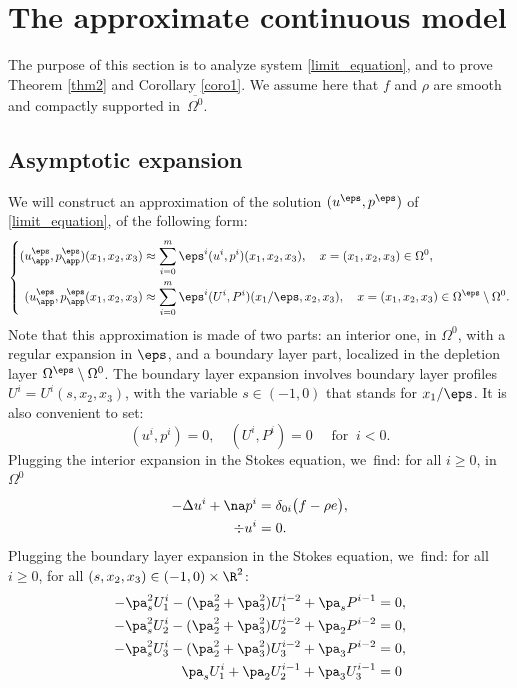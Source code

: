 \section{The approximate continuous model} \label{sec_wall_law}The purpose of this section is to analyze system \eqref{limit_equation}, and to prove Theorem \ref{thm2} and Corollary \ref{coro1}. We assume here that $f$ and $\rho$ are smooth and compactly supported in~$\overline{\Omega^0}$.

\subsection{Asymptotic expansion}
We will construct an approximation of the solution $(u^\eps,p^\eps)$ of \eqref{limit_equation}, of the following form:
\begin{equation*}
\left\{
\begin{aligned}
(u^\eps_{\app},p^\eps_{\app})(x_1,x_2,x_3) & \approx \sum_{i=0}^m \eps^i (u^i, p^i)(x_1,x_2,x_3), \quad x = (x_1,x_2,x_3) \in \Omega^0, \\
(u^\eps_{\app}, p^\eps_{\app}(x_1,x_2,x_3) & \approx \sum_{i=0}^m \eps^i (U^i, P^i)(x_1/\eps,x_2,x_3), \quad x = (x_1,x_2,x_3) \in \Omega^\eps\setminus\Omega^0.
\end{aligned}
\right.
\end{equation*}
Note that this approximation is made of two parts: an interior one, in $\Omega^0$, with a regular expansion in $\eps$, and a boundary layer part, localized in the depletion layer $\Omega^\eps \setminus\nobreak \Omega^0$. The boundary layer expansion involves boundary layer profiles $U^i = U^i(s,x_2,x_3)$, with the variable $s \in (-1,0)$ that stands for
$x_1/\eps$. It is also convenient to set:
\[
(u^i, p^i)= 0, \quad (U^i, P^i) = 0 \quad \text{ for } \: i < 0.
\]
Plugging the interior expansion in the Stokes equation, we~find: for all $i \ge 0$, in $\Omega^0$
\begin{equation} \label{stokesint}
\begin{aligned}
-\Delta u^i + \na p^i & = \delta_{0i} \big(f - \rho e \big), \\
\div u^i & = 0.
\end{aligned}
\end{equation}
Plugging the boundary layer expansion in the Stokes equation, we~find: for all $i \ge 0$, for all $(s,x_2,x_3) \in (-1,0) \times \R^2$:
\begin{align}
-\pa^2_s U^i_1 - (\pa^2_2 + \pa^2_3) U^{i-2}_1 + \pa_s P^{i-1} & = 0, \label{stokesx} \\
-\pa^2_s U^i_2 - (\pa^2_2 + \pa^2_3) U^{i-2}_2 + \pa_2 P^{i-2} & = 0, \label{stokesy}\\
-\pa^2_s U^i_3 - (\pa^2_2 + \pa^2_3) U^{i-2}_3 + \pa_3 P^{i-2} & = 0, \label{stokesz} \\
\pa_s U^i_1 + \pa_2 U^{i-1}_2 + \pa_3 U^{i-1}_3 & = 0 \label{stokesdiv}
\end{align}
